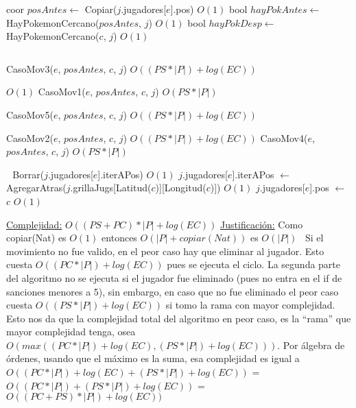 \begin{Algoritmos}
\begin{algorithmic}[1]
  \State coor $posAntes \gets$ Copiar($j$.jugadores[$e$].pos)  \Comment $O(1)$
  \State bool $hayPokAntes \gets$ HayPokemonCercano($posAntes$, $j$)  \Comment $O(1)$
  \State bool $hayPokDesp \gets$ HayPokemonCercano($c$, $j$)  \Comment $O(1)$ 
  
  \Statex $ $
  
  
      \State CasoMov3($e$, $posAntes$, $c$, $j$)  \Comment $O((PS *|P|) + log(EC))$ 
          
    \Else %
        \Comment $O(1)$
        \State CasoMov1($e$, $posAntes$, $c$, $j$) \Comment $O(PS *|P|)$ 
      \Else

        \State CasoMov5($e$, $posAntes$, $c$, $j$) \Comment  $O((PS *|P|) + log(EC))$ 
      \EndIf    
    \EndIf
  \Else %
      
      \State CasoMov2($e$, $posAntes$, $c$, $j$) \Comment  $O((PS *|P|) + log(EC))$ 
    \Else
      \State CasoMov4($e$, $posAntes$, $c$, $j$) \Comment  $O(PS *|P|)$ 
    \EndIf    
    
  \EndIf
  
  \Statex $ $
  \Statex $ $
  \State Borrar($j$.jugadores[$e$].iterAPos) \Comment $O(1)$
  \State $j$.jugadores[$e$].iterAPos $\gets$ AgregarAtras($j$.grillaJugs[Latitud($c$)][Longitud($c$)]) \Comment $O(1)$
  \State $j$.jugadores[$e$].pos $\gets$ $c$ \Comment $O(1)$ 
  
\EndIf

\medskip
\State \underline{Complejidad:} $O((PS + PC)*|P| + log(EC))$ 
\State \underline{Justificaci\'on:} Como copiar(Nat) es $O(1)$ entonces $O(|P| + copiar(Nat))$ es $O(|P|)$ \ Si el movimiento no fue valido, en el peor caso hay que eliminar al jugador. Esto cuesta $O((PC *|P|) + log(EC))$ pues se ejecuta el ciclo. La segunda parte del algoritmo no se ejecuta si el jugador fue eliminado (pues no entra en el if de sanciones menores a 5), sin embargo, en caso que no fue eliminado el peor caso cuesta $O((PS *|P|) + log(EC))$ si tomo la rama con mayor complejidad. Esto nos da que la complejidad total del algoritmo en peor caso, es la ``rama'' que mayor complejidad tenga, osea $O(max((PC *|P|) + log(EC), (PS *|P|) + log(EC)))$. Por \'algebra de \'ordenes, usando que el m\'aximo es la suma, esa complejidad es igual a $O((PC *|P|) + log(EC) + (PS *|P|) + log(EC))$ = $O((PC *|P|) + (PS *|P|) + log(EC))$ = $O((PC + PS) *|P|) + log(EC))$


\end{algorithmic}
\end{Algoritmos}
